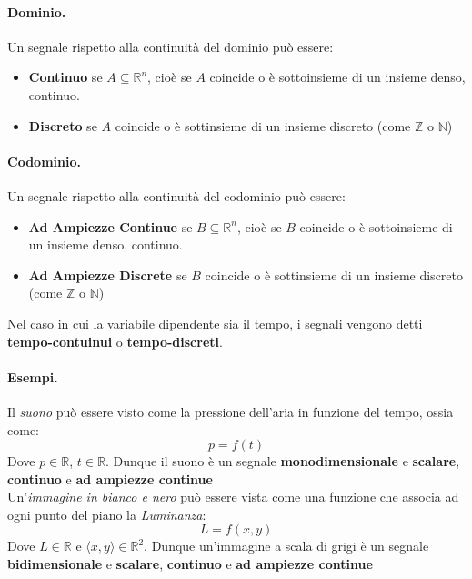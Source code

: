 \paragraph{Dominio.} Un segnale rispetto alla continuità del dominio può essere:
\begin{itemize}
    \item \textbf{Continuo} se $A \subseteq \mathbb{R}^n$, cioè se $A$ coincide o è sottoinsieme di un insieme denso, continuo.
    \item \textbf{Discreto} se $A$ coincide o è sottinsieme di un insieme discreto (come $\mathbb{Z}$ o $\mathbb{N}$)
\end{itemize}
\paragraph{Codominio.} Un segnale rispetto alla continuità del codominio può essere:
\begin{itemize}
    \item \textbf{Ad Ampiezze Continue} se $B \subseteq \mathbb{R}^n$, cioè se $B$ coincide o è sottoinsieme di un insieme denso, continuo.
    \item \textbf{Ad Ampiezze Discrete} se $B$ coincide o è sottinsieme di un insieme discreto (come $\mathbb{Z}$ o $\mathbb{N}$)
\end{itemize}
Nel caso in cui la variabile dipendente sia il tempo, i segnali vengono detti \textbf{tempo-contuinui} o \textbf{tempo-discreti}.

\paragraph{Esempi.}
Il \textit{suono} può essere visto come la pressione dell'aria in funzione del tempo, ossia come:
\begin{equation*}
    p = f(t)
\end{equation*}
Dove $p \in \mathbb{R}$, $t \in \mathbb{R}$. Dunque il suono è un segnale \textbf{monodimensionale} e \textbf{scalare}, \textbf{continuo} e \textbf{ad ampiezze continue}\\

Un'\textit{immagine in bianco e nero} può essere vista come una funzione che associa ad ogni punto del piano la \textit{Luminanza}:
\begin{equation*}
    L = f(x,y)
\end{equation*}
Dove $L \in \mathbb{R}$ e $\langle x,y \rangle \in \mathbb{R}^2 $. Dunque un'immagine a scala di grigi è un segnale \textbf{bidimensionale} e \textbf{scalare}, \textbf{continuo} e \textbf{ad ampiezze continue}\\

